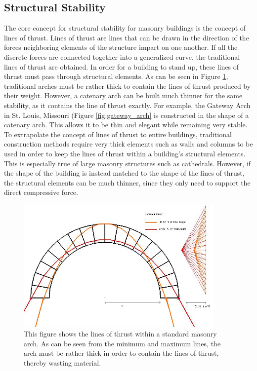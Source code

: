 \documentclass{thesis}
\begin{document}
\subsection{Structural Stability} \label{sec:stability}
The core concept for structural stability for masonry buildings is the concept of lines of thrust.  Lines of thrust are lines that can be drawn
in the direction of the forces neighboring elements of the structure impart on one another.  If all the discrete forces are connected together
into a generalized curve, the traditional lines of thrust are obtained.
In order for a building to stand up, these lines of thrust must pass through structural elements.  As can be seen in Figure \ref{fig:arch_lines},
traditional arches must be rather thick to contain the lines of thrust produced by their weight.  However, a catenary arch can be built
much thinner for the same stability, as it contains the line of thrust exactly.  For example, the Gateway Arch in St. Louis, Missouri (Figure
\ref{fig:gateway_arch} is constructed in the shape of a catenary arch.  This allows it to be thin and elegant while remaining very stable.
To extrapolate the concept of lines of thrust to entire buildings, traditional construction methods require very thick elements such as walls
and columns to be used in order to keep the lines of thrust within a building's structural elements.  This is especially true of large masonry
structures such as cathedrals.  However, if the shape of the building is instead matched to
the shape of the lines of thrust, the structural elements can be much thinner, since they only need to support the direct compressive force.
\begin{figure}
\centering
\includegraphics[width=4in]{images/arch.png}
\caption[Lines of thrust]{This figure shows the lines of thrust within a standard masonry arch.  As can be seen from the minimum and maximum
lines, the arch must be rather thick in order to contain the lines of thrust, thereby wasting material.\footnotemark}
\label{fig:arch_lines}
\end{figure}
\end{document}
